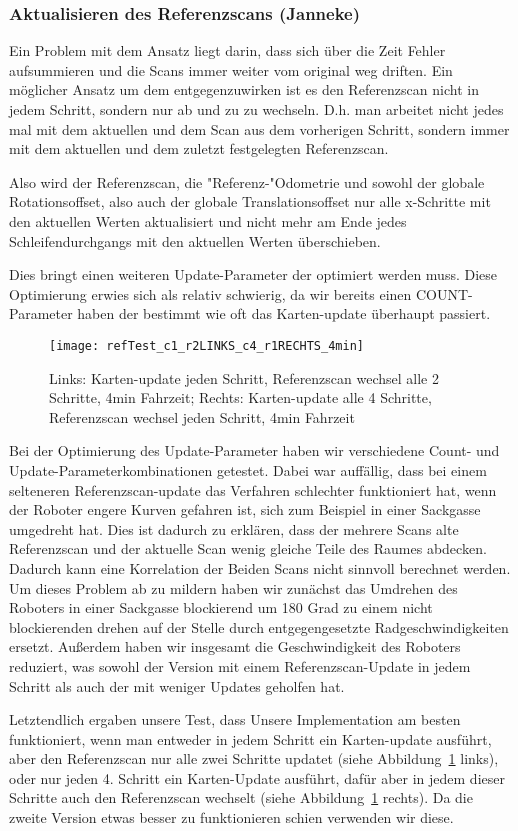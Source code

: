 \subsubsection{Aktualisieren des Referenzscans (Janneke)}

Ein Problem mit dem Ansatz liegt darin, dass sich über die Zeit Fehler aufsummieren und die Scans immer weiter vom original weg driften. Ein möglicher Ansatz um dem entgegenzuwirken ist es den Referenzscan nicht in jedem Schritt, sondern nur ab und zu zu wechseln. D.h. man arbeitet nicht jedes mal mit dem aktuellen und dem Scan aus dem vorherigen Schritt, sondern immer mit dem aktuellen und dem zuletzt festgelegten Referenzscan.

Also wird der Referenzscan, die "Referenz-"Odometrie und sowohl der globale Rotationsoffset, also auch der globale Translationsoffset nur alle x-Schritte mit den aktuellen Werten aktualisiert und nicht mehr am Ende jedes Schleifendurchgangs mit den aktuellen Werten überschieben. 

Dies bringt einen weiteren Update-Parameter der optimiert werden muss. Diese Optimierung erwies sich als relativ schwierig, da wir bereits einen COUNT-Parameter haben der bestimmt wie oft das Karten-update überhaupt passiert.

\begin{figure}
	\centering
	\texttt{[image: refTest\_c1\_r2LINKS\_c4\_r1RECHTS\_4min]}
	\caption{Links: Karten-update jeden Schritt, Referenzscan wechsel alle 2 Schritte, 4min Fahrzeit; Rechts: Karten-update alle 4 Schritte, Referenzscan wechsel jeden Schritt, 4min Fahrzeit\newline}
	\label{fig:refTest}
\end{figure}

Bei der Optimierung des Update-Parameter haben wir verschiedene Count- und Update-Parameterkombinationen getestet. Dabei war auffällig, dass bei einem selteneren Referenzscan-update das Verfahren schlechter funktioniert hat, wenn der Roboter engere Kurven gefahren ist, sich zum Beispiel in einer Sackgasse umgedreht hat. Dies ist dadurch zu erklären, dass der mehrere Scans alte Referenzscan und der aktuelle Scan wenig gleiche Teile des Raumes abdecken. Dadurch kann eine Korrelation der Beiden Scans nicht sinnvoll berechnet werden. Um dieses Problem ab zu mildern haben wir zunächst das Umdrehen des Roboters in einer Sackgasse blockierend um 180 Grad zu einem nicht blockierenden drehen auf der Stelle durch entgegengesetzte Radgeschwindigkeiten ersetzt. Außerdem haben wir insgesamt die Geschwindigkeit des Roboters reduziert, was sowohl der Version mit einem Referenzscan-Update in jedem Schritt als auch der mit weniger Updates geholfen hat.

Letztendlich ergaben unsere Test, dass Unsere Implementation am besten funktioniert, wenn man entweder in jedem Schritt ein Karten-update ausführt, aber den Referenzscan nur alle zwei Schritte updatet (siehe Abbildung~\ref{fig:refTest} links), oder nur jeden 4. Schritt ein Karten-Update ausführt, dafür aber in jedem dieser Schritte auch den Referenzscan wechselt (siehe Abbildung~\ref{fig:refTest} rechts). Da die zweite Version etwas besser zu funktionieren schien verwenden wir diese.